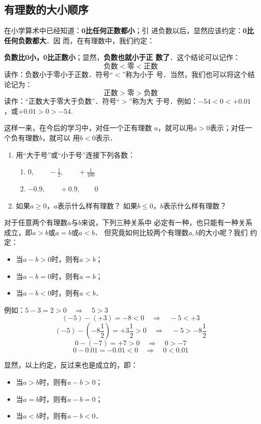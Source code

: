 \subsection{有理数的大小顺序}
在小学算术中已经知道：\textbf{0比任何正数都小}；引
进负数以后，显然应该约定：\textbf{0比任何负数都大}．因
而，在有理数中，我们约定：

\textbf{负数比0小，0比正数小}；显然，\textbf{负数也就小于正
	数了}．这个结论可以记作：
\[\text{负数}<\text{零}<\text{正数}\]
读作：负数小于零小于正数．符号“$<$”称为小于
号．当然，我们也可以将这个结论记为：
\[\text{正数}>\text{零}>\text{负数}\]
读作：“正数大于零大于负数”．符号“$>$”称为大
于号．例如：$-54<0<+0.01$，或$+0.01>0> -54$.

这样一来，在今后的学习中，对任一个正有理数
$a$，就可以用$a>0$表示；对任一个负有理数$b$，就可以
用$b<0$表示．

\begin{ex}
	\begin{enumerate}
		\item 用“大于号”或“小于号”连接下列各数：
		\begin{enumerate}
			\item $0,\qquad -\frac{1}{2},\qquad +\frac{1}{100}$
			\item $-0.9,\qquad +0.9,\qquad 0$
		\end{enumerate}
		\item 如果$a\ge 0$，$a$表示什么样有理数？
		如果$b\le 0$，$b$表示什么样有理数？
	\end{enumerate}
\end{ex}   

对于任意两个有理数$a$与$b$来说，下列三种关系中
必定有一种，也只能有一种关系成立，即$a>b$或$a =b$或$a<b$．
但究竟如何比较两个有理数$a,  b$的大小呢？我们
约定：
\begin{itemize}
	\item 当$a-b>0$时，则有$a > b$；
	\item     当$a-b=0$时，则有$a=b$；
	\item   当$a-b<0$时，则有$a < b$．
\end{itemize}

例如：$5-3=2>0 \quad \Rightarrow\quad 5>3$
\[(-5)-(+3)=-8<0 \quad \Rightarrow\quad -5<+3\]
\[(-5)-\left(-8\frac{1}{2}\right)=+3\frac{1}{2}>0 \quad \Rightarrow\quad -5>-8\frac{1}{2}\]
\[0-(-7)=+7>0 \quad \Rightarrow\quad 0>-7\]
\[0-0.01=-0.01<0 \quad \Rightarrow\quad 0<0.01\]

显然，以上约定，反过来也是成立的，即：
\begin{itemize}
	\item 当$a>b$时，则有$a-b>0$；
	\item     当$a =b$时，则有$a-b=0$；
	\item     当$a<b$时，则有$a-b<0$．
\end{itemize}

